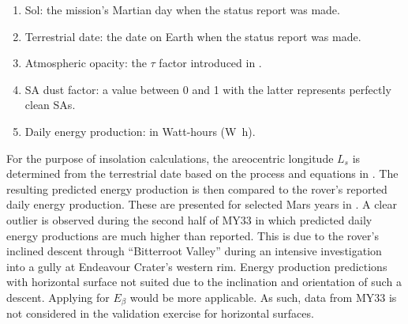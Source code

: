 \begin{enumerate}[label=\textcolor{BulletBlue}{(\alph*)}]
  \item Sol: the mission's Martian day when the status report was made.
  \item Terrestrial date: the date on Earth when the status report was made.
  \item Atmospheric opacity: the $\tau$ factor introduced in  .
  \item \ac{SA} dust factor: a value between 0 and 1 with the latter represents perfectly clean \acp{SA}.
  \item Daily energy production: in Watt-hours (\si{\watt\hour}).
\end{enumerate}

For the purpose of insolation calculations, the areocentric longitude $L_{s}$ is determined from the terrestrial date based on the process and equations in . The resulting predicted energy production is then compared to the rover's reported daily energy production. These are presented for selected Mars years in . A clear outlier is observed during the second half of \ac{MY}33 in which predicted daily energy productions are much higher than reported. This is due to the rover's inclined descent through ``Bitterroot Valley'' during an intensive investigation into a gully at Endeavour Crater's western rim. Energy production predictions with horizontal surface  not suited due to the inclination and orientation of such a descent. Applying  for $E_{\beta}$ would be more applicable. As such, data from \ac{MY}33 is not considered in the validation exercise for horizontal surfaces.

